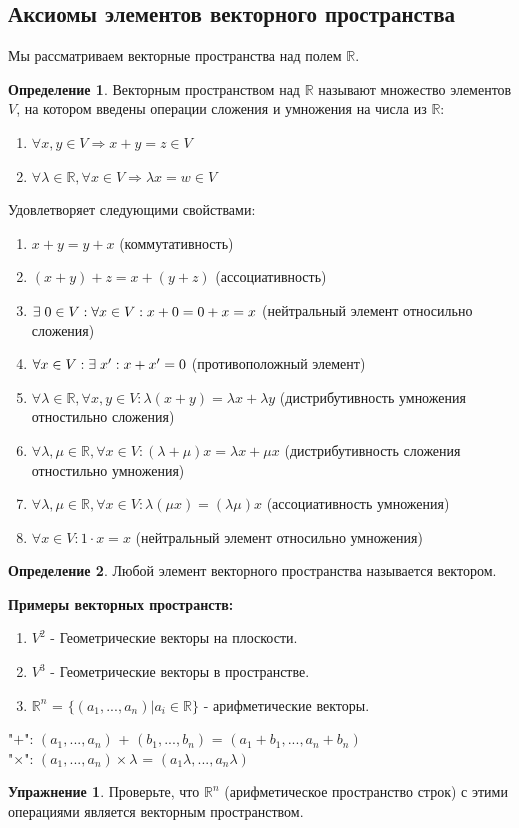 \documentclass[a4paper, 12pt]{article}
\newcommand{\R}{\mathbb R}
\newcommand\tab[1][.5cm]{\hspace*{#1}}
\theoremstyle{definition}
\newtheorem*{definition}{Определение}
\newtheorem*{lalala}{Упражнение}
\begin{document}
  \subsection{Аксиомы элементов векторного пространства}
  Мы рассматриваем векторные пространства над полем $\R$.
  \begin{definition}
    Векторным пространством над $\R$ называют множество элементов $V$, на котором введены операции сложения и умножения на числа из $\R$:
    \begin{enumerate}
      \item $ \forall x,y \in V \Longrightarrow x+y=z \in V$
      \item $\forall \lambda \in \R, \forall x \in V \Longrightarrow \lambda x = w \in V$ 
    \end{enumerate}
    Удовлетворяет следующими свойствами:
    \begin{enumerate}
      \item $x+y = y+x$ (коммутативность)
      \item $(x+y)+z = x+(y+z)$ (ассоциативность)
      \item $\exists \tab[0.1cm] 0 \in V: \forall x \in V: x+0 = 0+x = x$ (нейтральный элемент относильно сложения)
      \item $\forall x \in V: \exists \tab[0.1cm] x^{\prime}: x + x^{\prime} = 0$ (противоположный элемент)
      \item $\forall \lambda \in \R, \forall x,y \in V: \lambda (x+y) = \lambda x + \lambda y$ (дистрибутивность умножения отностильно сложения)
      \item $\forall \lambda, \mu \in \R, \forall x \in V: (\lambda+\mu)x = \lambda x + \mu x $ (дистрибутивность сложения отностильно умножения)
      \item $\forall \lambda, \mu \in \R, \forall x \in V: \lambda(\mu x) = (\lambda \mu) x $ (ассоциативность умножения)
      \item $\forall x \in V: 1 \cdot x = x$ (нейтральный элемент относильно умножения)
    \end{enumerate}
  \end{definition} 

  \begin{definition}
    Любой элемент векторного пространства называется вектором.
  \end{definition} 

  \textbf{Примеры векторных пространств:} 
    \begin{enumerate} 
      \item $V^2$ - Геометрические векторы на плоскости.
      \item $V^3$ - Геометрические векторы в пространстве.
      \item $\R^n$ = $\{ {(a_1,...,a_n) | a_i \in \R} \}$ - арифметические векторы.
    \end{enumerate}
    \tab[0.8cm]"$+$": $(a_1,...,a_n)$ + $(b_1,...,b_n)$ = $(a_1+b_1,...,a_n+b_n)$ \\
    \tab[0.8cm]"$\times$": $(a_1,...,a_n) \times \lambda$ = $(a_1\lambda,...,a_n\lambda)$ 
  \begin{lalala}
    Проверьте, что $\R^n$ (арифметическое пространство строк) с этими операциями является векторным пространством. 
  \end{lalala}  
\end{document}
